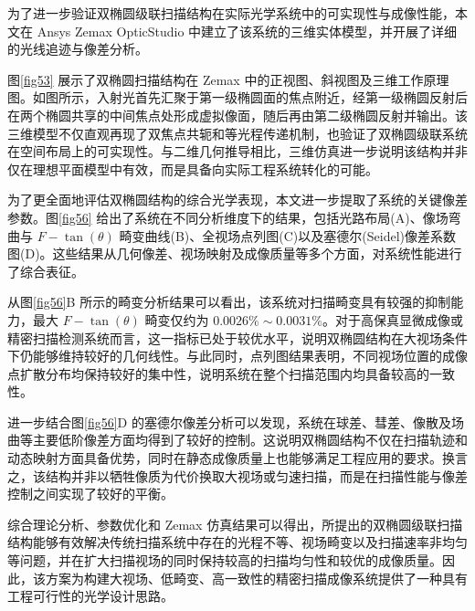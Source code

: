 为了进一步验证双椭圆级联扫描结构在实际光学系统中的可实现性与成像性能，本文在 Ansys Zemax OpticStudio 中建立了该系统的三维实体模型，并开展了详细的光线追迹与像差分析。

图\ref{fig53} 展示了双椭圆扫描结构在 Zemax 中的正视图、斜视图及三维工作原理图。如图所示，入射光首先汇聚于第一级椭圆面的焦点附近，经第一级椭圆反射后在两个椭圆共享的中间焦点处形成虚拟像面，随后再由第二级椭圆反射并输出。该三维模型不仅直观再现了双焦点共轭和等光程传递机制，也验证了双椭圆级联系统在空间布局上的可实现性。与二维几何推导相比，三维仿真进一步说明该结构并非仅在理想平面模型中有效，而是具备向实际工程系统转化的可能。

为了更全面地评估双椭圆结构的综合光学表现，本文进一步提取了系统的关键像差参数。图\ref{fig56} 给出了系统在不同分析维度下的结果，包括光路布局(A)、像场弯曲与 $F-\tan(\theta)$ 畸变曲线(B)、全视场点列图(C)以及塞德尔(Seidel)像差系数图(D)。这些结果从几何像差、视场映射及成像质量等多个方面，对系统性能进行了综合表征。


从图\ref{fig56}B 所示的畸变分析结果可以看出，该系统对扫描畸变具有较强的抑制能力，最大 $F-\tan(\theta)$ 畸变仅约为 $0.0026\%\sim0.0031\%$。对于高保真显微成像或精密扫描检测系统而言，这一指标已处于较优水平，说明双椭圆结构在大视场条件下仍能够维持较好的几何线性。与此同时，点列图结果表明，不同视场位置的成像点扩散分布均保持较好的集中性，说明系统在整个扫描范围内均具备较高的一致性。

进一步结合图\ref{fig56}D 的塞德尔像差分析可以发现，系统在球差、彗差、像散及场曲等主要低阶像差方面均得到了较好的控制。这说明双椭圆结构不仅在扫描轨迹和动态映射方面具备优势，同时在静态成像质量上也能够满足工程应用的要求。换言之，该结构并非以牺牲像质为代价换取大视场或匀速扫描，而是在扫描性能与像差控制之间实现了较好的平衡。

综合理论分析、参数优化和 Zemax 仿真结果可以得出，所提出的双椭圆级联扫描结构能够有效解决传统扫描系统中存在的光程不等、视场畸变以及扫描速率非均匀等问题，并在扩大扫描视场的同时保持较高的扫描均匀性和较优的成像质量。因此，该方案为构建大视场、低畸变、高一致性的精密扫描成像系统提供了一种具有工程可行性的光学设计思路。